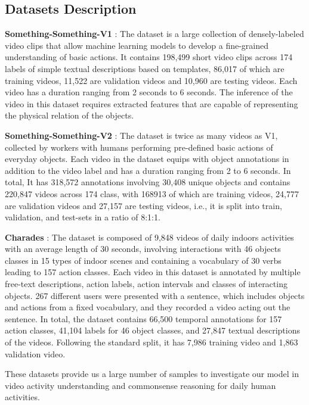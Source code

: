 \documentclass[conference,compsoc]{IEEEtran}
\begin{document}
\subsection{Datasets Description}
    \textbf{Something-Something-V1} \cite{goyal2017something}: The dataset is a large collection of densely-labeled video clips that allow machine learning models to develop a fine-grained understanding of basic actions. It contains 198,499 short video clips across 174 labels of simple textual descriptions based on templates, 86,017 of which are training videos, 11,522 are validation videos and 10,960 are testing videos. Each video has a duration ranging from 2 seconds to 6 seconds. The inference of the video in this dataset requires extracted features that are capable of representing the physical relation of the objects. 
    
    \textbf{Something-Something-V2} \cite{mahdisoltani2018fine}: The dataset is twice as many videos as V1, collected by workers with humans performing pre-defined basic actions of everyday objects. Each video in the dataset equips with object annotations in addition to the video label and has a duration ranging from 2 to 6 seconds. In total, It has 318,572 annotations involving 30,408 unique objects and contains 220,847 videos across 174 class, with 168913 of which are training videos, 24,777 are validation videos and 27,157 are testing videos, i.e., it is split into train, validation, and test-sets in a ratio of 8:1:1.
    
     \textbf{Charades} \cite{sigurdsson2016hollywood}: The dataset is composed of 9,848 videos of daily indoors activities with an average length of 30 seconds, involving interactions with 46 objects classes in 15 types of indoor scenes and containing a vocabulary of 30 verbs leading to 157 action classes. Each video in this dataset is annotated by multiple free-text descriptions, action labels, action intervals and classes of interacting objects. 267 different users were presented with a sentence, which includes objects and actions from a fixed vocabulary, and they recorded a video acting out the sentence. In total, the dataset contains 66,500 temporal annotations for 157 action classes, 41,104 labels for 46 object classes, and 27,847 textual descriptions of the videos. Following the standard split, it has 7,986 training video and 1,863 validation video.
    
    These datasets provide us a large number of samples to investigate our model in video activity understanding and commonsense reasoning for daily human activities.
    
\end{document}
